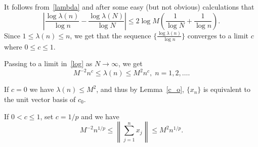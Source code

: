 \documentclass[12pt]{report}
\begin{document}
It follows from~\eqref{lambda} and after some easy (but not obvious) calculations that
\begin{equation}\label{log}
\left|\frac{\log\lambda(n)}{\log n} - \frac{\log\lambda(N)}{\log N}\right|
\leq 2\log M \left(\frac{1}{\log N} + \frac{1}{\log n}\right).
\end{equation}
Since $1\leq\lambda(n)\leq n$, we get that the sequence $\{\frac{\log\lambda(n)}{\log n}\}$
converges to a limit $c$ where $0\leq c\leq 1$.

Passing to a limit in~\eqref{log} as $N\rightarrow\infty$, we get
$$
M^{-2}n^c \leq \lambda(n) \leq M^2 n^c,\;n=1,2,\ldots.
$$

If $c=0$ we have $\lambda(n) \leq M^2$, and thus by Lemma~\ref{c_o}, $\{x_n\}$ is equivalent to
the unit vector basis of $c_0$.

If $0<c\leq 1$, set $c=1/p$ and we have
\begin{equation}\label{l_p:1}
M^{-2}n^{1/p} \leq \left\|\sum_{j=1}^n x_j \right\| \leq M^2 n^{1/p}.
\end{equation}
\end{document}
